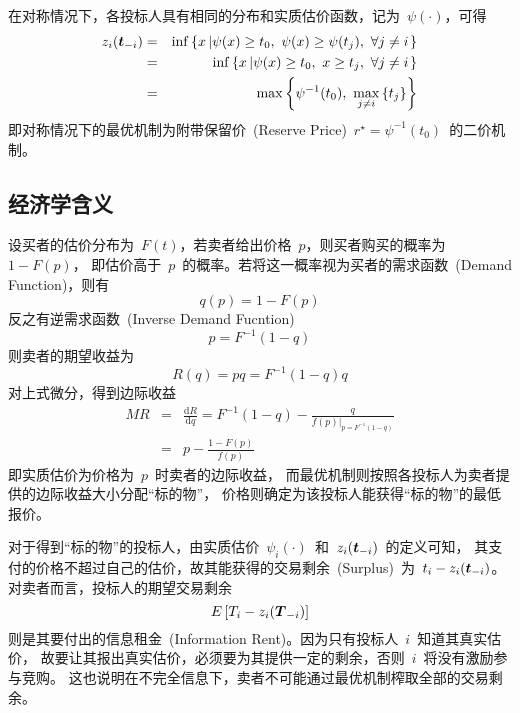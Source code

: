 \documentclass[a4paper,12pt]{article}
\newcommand{\mv}[1]{\mbox{\boldmath$#1$}}         %
\newcommand{\id}{\mathrm{d}}                      %
\begin{document}
在对称情况下，各投标人具有相同的分布和实质估价函数，记为~$\psi(\cdot)$，可得
\begin{eqnarray*}
  z_i(\mv{t}_{-i}) &=& \inf\left\{x\left|\psi(x) \ge t_0,~\psi(x)
                     \ge \psi(t_j),~\forall j\neq i\right.\right\} \\
   &=& \inf\left\{x\left|\psi(x) \ge t_0,~x
                     \ge t_j,~\forall j\neq i\right.\right\} \\
   &=& \max\left\{\psi^{-1}(t_0),~\max\limits_{j\neq i} \left\{t_j\right\}\right\}
\end{eqnarray*}
即对称情况下的最优机制为附带保留价~(Reserve Price)~$r^\star = \psi^{-1}(t_0)$~的二价机制。

\subsection{经济学含义}

设买者的估价分布为~$F(t)$，若卖者给出价格~$p$，则买者购买的概率为~$1-F(p)$，
即估价高于~$p$~的概率。若将这一概率视为买者的需求函数~(Demand Function)，则有
\begin{equation*}
    q(p)=1-F(p)
\end{equation*}
反之有逆需求函数~(Inverse Demand Fucntion)
\begin{equation*}
    p=F^{-1}(1-q)
\end{equation*}
则卖者的期望收益为
\begin{equation*}
    R(q)=pq=F^{-1}(1-q)q
\end{equation*}
对上式微分，得到边际收益
\begin{eqnarray*}
  MR &=& \frac{\id R}{\id q} = F^{-1}(1-q) - \frac{q}{f(p)|_{p=F^{-1}(1-q)}}
  \\
     &=& p - \frac{1 - F(p)}{f(p)}
\end{eqnarray*}
即实质估价为价格为~$p$~时卖者的边际收益，
而最优机制则按照各投标人为卖者提供的边际收益大小分配``标的物''，
价格则确定为该投标人能获得``标的物''的最低报价。

对于得到``标的物''的投标人，由实质估价~$\psi_i(\cdot)$~和~$z_i(\mv{t}_{-i})$~的定义可知，
其支付的价格不超过自己的估价，故其能获得的交易剩余~(Surplus)~为~$t_i-z_i(\mv{t}_{-i})$。
对卖者而言，投标人的期望交易剩余
\begin{equation*}
    E\left[T_i-z_i(\mv{T}_{-i})\right]
\end{equation*}
则是其要付出的信息租金~(Information Rent)。因为只有投标人~$i$~知道其真实估价，
故要让其报出真实估价，必须要为其提供一定的剩余，否则~$i$~将没有激励参与竞购。
这也说明在不完全信息下，卖者不可能通过最优机制榨取全部的交易剩余。
\end{document}
